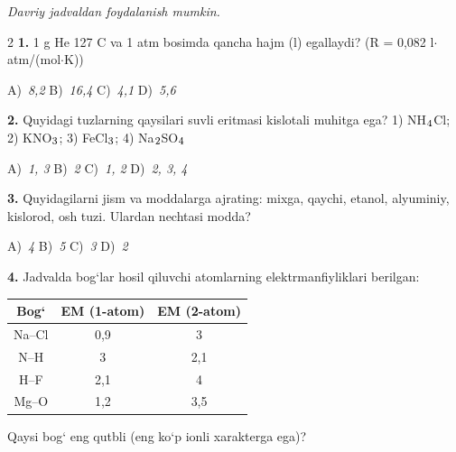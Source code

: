 \documentclass[11pt,a4paper]{article}
\renewcommand{\normalsize}{\fontsize{10.9}{13.4}\selectfont}
\renewcommand{\textsubscript}[1]{\ensuremath{_{\text{\fontsize{8}{8}\selectfont #1}}}}
\begin{document}
\normalsize
\thispagestyle{first}
\noindent{}
\par\medskip
\noindent\textit{Davriy jadvaldan foydalanish mumkin.}
\par\medskip
\begin{multicols}{2}
\noindent\textbf{1.} 1 g He 127 \textdegree{}C va 1 atm bosimda qancha hajm (l) egallaydi? (R = 0,082 l$\cdot$atm/(mol$\cdot$K))

\noindent A)~\textsl{8,2} \hfill B)~\textsl{16,4} \hfill C)~\textsl{4,1} \hfill D)~\textsl{5,6}\par
\vspace{4pt}
\noindent\textbf{2.} Quyidagi tuzlarning qaysilari suvli eritmasi kislotali muhitga ega? 1) NH\textsubscript{4}Cl; 2) KNO\textsubscript{3}; 3) FeCl\textsubscript{3}; 4) Na\textsubscript{2}SO\textsubscript{4}

\noindent A)~\textsl{1, 3} \hfill B)~\textsl{2} \hfill C)~\textsl{1, 2} \hfill D)~\textsl{2, 3, 4}\par
\vspace{4pt}
\noindent\textbf{3.} Quyidagilarni jism va moddalarga ajrating: mixga, qaychi, etanol, alyuminiy, kislorod, osh tuzi. Ulardan nechtasi modda?

\noindent A)~\textsl{4} \hfill B)~\textsl{5} \hfill C)~\textsl{3} \hfill D)~\textsl{2}\par
\vspace{4pt}
\noindent\textbf{4.} Jadvalda bog`lar hosil qiluvchi atomlarning elektrmanfiyliklari berilgan:
\begin{center}
\renewcommand{\arraystretch}{1.15}
\begin{tabular}{|c|c|c|}\hline
\textbf{Bog`} & \textbf{EM (1-atom)} & \textbf{EM (2-atom)} \\ \hline
Na--Cl & 0,9 & 3 \\ \hline
N--H & 3 & 2,1 \\ \hline
H--F & 2,1 & 4 \\ \hline
Mg--O & 1,2 & 3,5 \\ \hline
\end{tabular}
\end{center}
Qaysi bog` eng qutbli (eng ko`p ionli xarakterga ega)?


\end{multicols}
\end{document}
